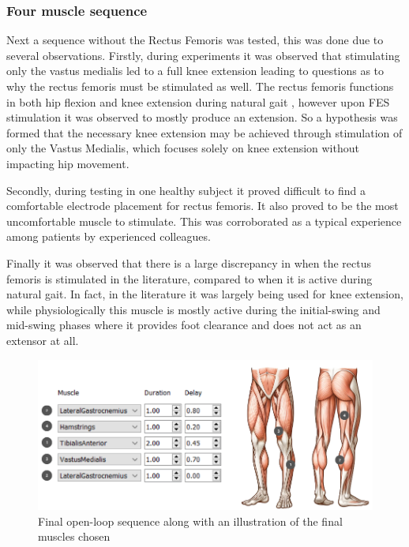\subsubsection{Four muscle sequence}
Next a sequence without the Rectus Femoris was tested, this was done due to several observations. Firstly, during experiments it was observed that stimulating only the vastus medialis led to a full knee extension leading to questions as to why the rectus femoris must be stimulated as well. The rectus femoris functions in both hip flexion and knee extension during natural gait , however upon FES stimulation it was observed to mostly produce an extension. So a hypothesis was formed that the necessary knee extension may be achieved through stimulation of only the Vastus Medialis, which focuses solely on knee extension without impacting hip movement. 

Secondly, during testing in one healthy subject it proved difficult to find a comfortable electrode placement for rectus femoris. It also proved to be the most uncomfortable muscle to stimulate. This was corroborated as a typical experience among patients by experienced colleagues. 

Finally it was observed that there is a large discrepancy in when the rectus femoris is stimulated in the literature, compared to when it is active during natural gait. In fact, in the literature it was largely being used for knee extension, while physiologically this muscle is mostly active during the initial-swing and mid-swing phases where it provides foot clearance and does not act as an extensor at all. 

\begin{figure} [h]
    \centering
    \includegraphics[width=0.99\linewidth]{images/final_seq_w_muscles.png}
    \caption{Final open-loop sequence along with an illustration of the final muscles chosen}
    \label{fig:fianlsequence}
\end{figure}


